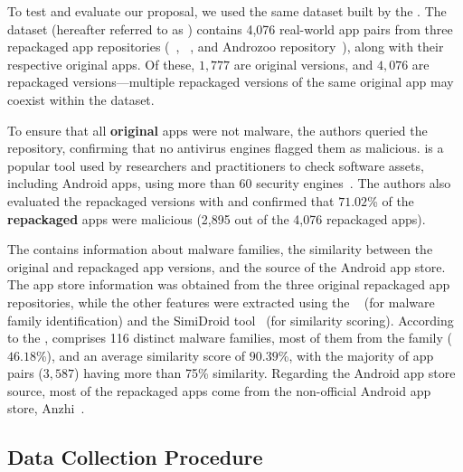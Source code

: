 
To test and evaluate our proposal, we used the same dataset built by the \fhc. The dataset (hereafter referred to as \cds) contains 4,076 real-world app pairs from three repackaged app repositories (\repack~\cite{DBLP:journals/tse/LiBK21}, \amc~\cite{rafiq2022andromalpack}, and Androzoo repository~\cite{DBLP:conf/msr/AllixBKT16}), along with their respective original apps. Of these, $1,777$ are original versions, and $4,076$ are repackaged versions---multiple repackaged versions of the same original app may coexist within the \cds dataset.

To ensure that all {\bf original} apps were not malware, the authors queried the \vt repository, confirming that no antivirus engines flagged them as malicious. \vt is a popular tool used by researchers and practitioners to check software assets, including Android apps, using more than 60 security engines~\cite{DBLP:journals/ese/KhanmohammadiEH19}. The authors also evaluated the repackaged versions with \vt and confirmed that $71.02$\% of the {\bf repackaged} apps were malicious (2,895 out of the 4,076 repackaged apps).

The \cds contains information about malware families, the similarity between the original and repackaged app versions, and the source of the Android app store. The app store information was obtained from the three original repackaged app repositories, while the other features were extracted using the \avt~\cite{avclass2-paper} (for malware family identification) and the SimiDroid tool~\cite{DBLP:conf/trustcom/0029BK17} (for similarity scoring). According to the \fhc, \cds comprises 116 distinct malware families, most of them from the \gps family ($46.18$\%), and an average similarity score of $90.39$\%, with the majority of app pairs ($3,587$) having more than 75\% similarity. Regarding the Android app store source, most of the repackaged apps come from the non-official Android app store, Anzhi~\cite{anzhi}.



\subsection{\mas Data Collection Procedure}\label{sec:mas}


